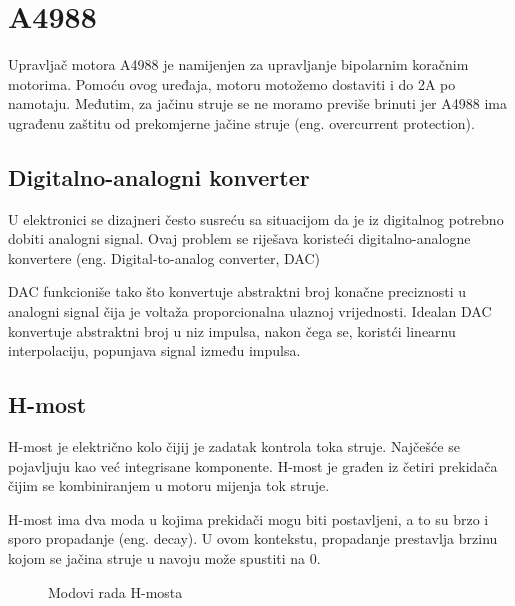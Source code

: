 \documentclass[../Document.tex]{subfiles}
\begin{document}
\section{A4988} \label{acdoo}
Upravljač motora A4988 je namijenjen za upravljanje bipolarnim koračnim motorima. Pomoću ovog uređaja, motoru motožemo dostaviti i do 2A po namotaju. Međutim, za jačinu struje se ne moramo previše brinuti jer A4988 ima ugrađenu zaštitu od prekomjerne jačine struje (eng. overcurrent protection).

\subsection{Digitalno-analogni konverter}
U elektronici se dizajneri često susreću sa situacijom da je iz digitalnog potrebno dobiti analogni signal. Ovaj problem se riješava koristeći digitalno-analogne konvertere (eng. Digital-to-analog converter, DAC)

DAC funkcioniše tako što konvertuje abstraktni broj konačne preciznosti u analogni signal čija je voltaža proporcionalna ulaznoj vrijednosti. Idealan DAC konvertuje abstraktni broj u niz impulsa, nakon čega se, koristći linearnu interpolaciju, popunjava signal između impulsa.

\subsection{H-most}
H-most je električno kolo čijij je zadatak kontrola toka struje. Najčešće se pojavljuju kao već integrisane komponente. H-most je građen iz četiri prekidača čijim se kombiniranjem u motoru mijenja tok struje.


H-most ima dva moda u kojima prekidači mogu biti postavljeni, a to su brzo i sporo propadanje (eng. decay). U ovom kontekstu, propadanje prestavlja brzinu kojom se jačina struje u navoju može spustiti na 0.

\begin{figure}
    \centering
    \qquad
    \caption{Modovi rada H-mosta}
\end{figure}
\end{document}
